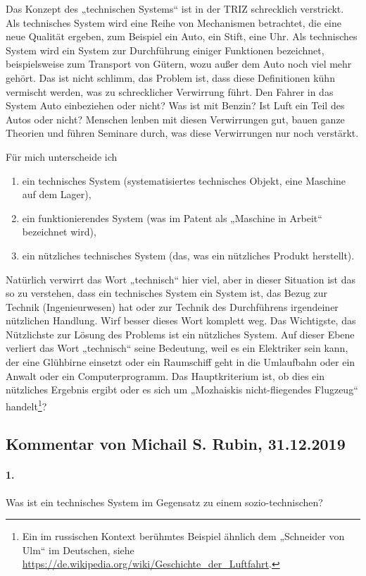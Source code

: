 \documentclass[11pt,a4paper]{article}
\begin{document}
Das Konzept des „technischen Systems“ ist in der TRIZ schrecklich verstrickt.
Als technisches System wird eine Reihe von Mechanismen betrachtet, die eine
neue Qualität ergeben, zum Beispiel ein Auto, ein Stift, eine Uhr. Als
technisches System wird ein System zur Durchführung einiger Funktionen
bezeichnet, beispielsweise zum Transport von Gütern, wozu außer dem Auto noch
viel mehr gehört. Das ist nicht schlimm, das Problem ist, dass diese
Definitionen kühn vermischt werden, was zu schrecklicher Verwirrung führt.
Den Fahrer in das System Auto einbeziehen oder nicht? Was ist mit Benzin? Ist
Luft ein Teil des Autos oder nicht? Menschen lenben mit diesen Verwirrungen
gut, bauen ganze Theorien und führen Seminare durch, was diese Verwirrungen
nur noch verstärkt.

Für mich unterscheide ich
\begin{enumerate}
\item ein technisches System (systematisiertes technisches Objekt, eine
  Maschine auf dem Lager),
\item ein funktionierendes System (was im Patent als „Maschine in Arbeit“
  bezeichnet wird),
\item ein nützliches technisches System (das, was ein nützliches Produkt
  herstellt).
\end{enumerate}

Natürlich verwirrt das Wort „technisch“ hier viel, aber in dieser Situation
ist das so zu verstehen, dass ein technisches System ein System ist, das Bezug
zur Technik (Ingenieurwesen) hat oder zur Technik des Durchführens irgendeiner
nützlichen Handlung. Wirf besser dieses Wort komplett weg. Das Wichtigste, das
Nützlichste zur Lösung des Problems ist ein nützliches System. Auf dieser
Ebene verliert das Wort „technisch“ seine Bedeutung, weil es ein Elektriker
sein kann, der eine Glühbirne einsetzt oder ein Raumschiff geht in die
Umlaufbahn oder ein Anwalt oder ein Computerprogramm. Das Hauptkriterium ist,
ob dies ein nützliches Ergebnis ergibt oder es sich um „Mozhaiskis
nicht-fliegendes Flugzeug“ handelt\footnote{Ein im russischen Kontext
  berühmtes Beispiel ähnlich dem „Schneider von Ulm“ im Deutschen, siehe
  \url{https://de.wikipedia.org/wiki/Geschichte_der_Luftfahrt}.}?

\subsection{Kommentar von Michail S. Rubin, 31.12.2019}

\paragraph{1.}
Was ist ein technisches System im Gegensatz zu einem sozio-technischen?
\end{document}
